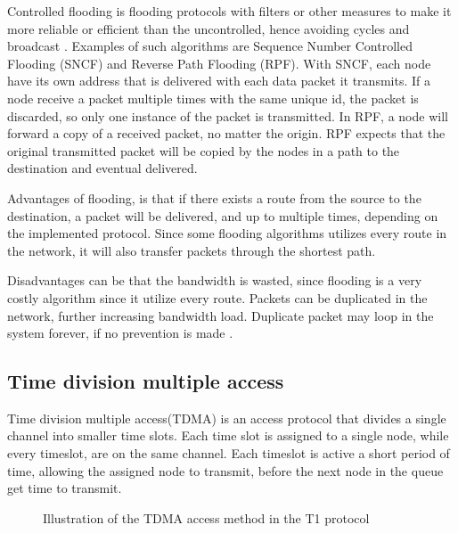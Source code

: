 Controlled flooding is flooding protocols with filters or other measures to make it more reliable or efficient than the uncontrolled, hence avoiding cycles and broadcast \cite{controlled_flooding}.
Examples of such algorithms are Sequence Number Controlled Flooding (SNCF) and Reverse Path Flooding (RPF).
With SNCF, each node have its own address that is delivered with each data packet it transmits.
If a node receive a packet multiple times with the same unique id, the packet is discarded, so only one instance of the packet is transmitted.
In RPF, a node will forward a copy of a received packet, no matter the origin.
RPF expects that the original transmitted packet will be copied by the nodes in a path to the destination and eventual delivered\cite{RPF}.

Advantages of flooding, is that if there exists a route from the source to the destination, a packet will be delivered, and up to multiple times, depending on the implemented protocol.
Since some flooding algorithms utilizes every route in the network, it will also transfer packets through the shortest path\cite{flooding}.

Disadvantages can be that the bandwidth is wasted, since flooding is a very costly algorithm since it utilize every route.
Packets can be duplicated in the network, further increasing bandwidth load.
Duplicate packet may loop in the system forever, if no prevention is made \cite{flooding}.


\subsection{Time division multiple access}
Time division multiple access(TDMA) is an access protocol that divides a single channel into smaller time slots.
Each time slot is assigned to a single node, while every timeslot, are on the same channel.
Each timeslot is active a short period of time, allowing the assigned node to transmit, before the next node in the queue get time to transmit\cite{TDMA}.

\begin{figure}[!h]
	\centering
	\caption{Illustration of the TDMA access method in the T1 protocol\cite{TDMA}}
	\label{fig:TDMAfigure}
\end{figure}

